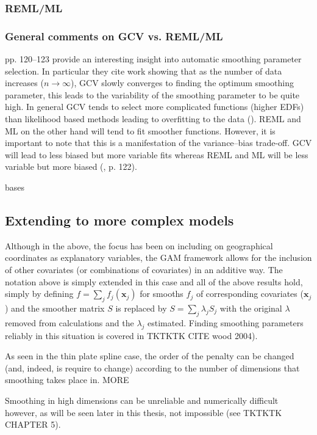 \subsubsection{REML/ML}


\subsubsection{General comments on GCV vs. REML/ML}

\cite{rwc} pp. 120--123 provide an interesting insight into automatic smoothing parameter selection. In particular they cite work showing that as the number of data increases ($n\rightarrow\infty$), GCV slowly converges to finding the optimum smoothing parameter, this leads to the variability of the smoothing parameter to be quite high. In general GCV tends to select more complicated functions (higher EDFs) than likelihood based methods leading to overfitting to the data (\cite{remlpaper}). REML and ML on the other hand will tend to fit smoother functions. However, it is important to note that this is a manifestation of the variance--bias trade-off. GCV will lead to less biased but more variable fits whereas REML and ML will be less variable but more biased (\cite{rwc}, p. 122).


bases


\subsection{Extending to more complex models}

Although in the above, the focus has been on including on geographical coordinates as explanatory variables, the GAM framework allows for the inclusion of other covariates (or combinations of covariates) in an additive way. The notation above is simply extended in this case and all of the above results hold, simply by defining $f=\sum_j f_j(\mathbf{x}_j)$ for smooths $f_j$ of corresponding covariates ($\mathbf{x}_j$) and the smoother matrix $S$ is replaced by $S= \sum_j \lambda_j S_j$ with the original $\lambda$ removed from calculations and the $\lambda_j$ estimated. Finding smoothing parameters reliably in this situation is covered in TKTKTK CITE wood 2004).

As seen in the thin plate spline case, the order of the penalty can be changed (and, indeed, is require to change) according to the number of dimensions that smoothing takes place in. MORE

Smoothing in high dimensions can be unreliable and numerically difficult however, as will be seen later in this thesis, not impossible (see TKTKTK CHAPTER 5).

